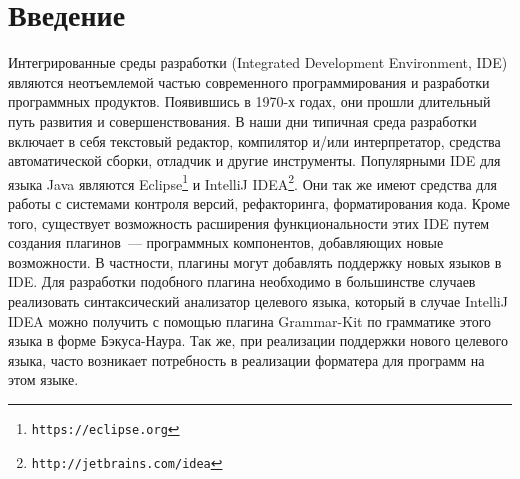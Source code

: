 \section*{Введение}
\lstset{basicstyle=\normalsize\ttfamily, columns=fullflexible}

Интегрированные среды разработки (Integrated Development Environment, IDE) являются неотъемлемой частью современного программирования и разработки программных продуктов. 
Появившись в 1970-х годах, они прошли длительный путь развития и совершенствования. 
В наши дни типичная среда разработки включает в себя текстовый редактор, компилятор и/или интерпретатор, средства автоматической сборки, отладчик и другие инструменты. 
Популярными IDE для языка Java являются Eclipse\footnote{\texttt{https://eclipse.org}} и IntelliJ IDEA\footnote{\texttt{http://jetbrains.com/idea}}.
Они так же имеют средства для работы с системами контроля версий, рефакторинга, форматирования кода. 
Кроме того, существует возможность расширения функциональности этих IDE путем создания плагинов~--- программных компонентов, добавляющих новые возможности.
В частности, плагины могут добавлять поддержку новых языков в IDE.
Для разработки подобного плагина необходимо в большинстве случаев реализовать синтаксический анализатор целевого языка, который в случае IntelliJ IDEA можно получить с помощью плагина Grammar-Kit по грамматике этого языка в форме Бэкуса-Наура.
Так же, при реализации поддержки нового целевого языка, часто возникает потребность в реализации форматера для программ на этом языке.

